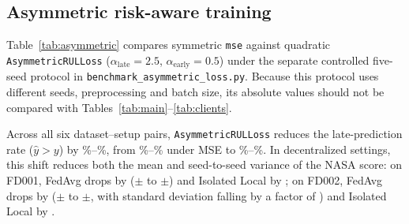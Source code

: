 \begin{table}[t]
\centering
\caption{FedAvg, FedProx and FedAdam across IID, regime-grouped and engine-count-imbalanced partitions on FD002 and FD004.}
\label{tab:partitions}

\end{table}

\begin{table}[t]
\centering
\caption{Per-client RMSE and NASA score on regime-grouped FD002 and FD004 (mean $\pm$ sample standard deviation over five paired seeds). Client labels denote the two operating-regime groups; ``exp.'' denotes the capped exponential objective.}
\label{tab:clients}

\end{table}

\begin{table}[t]
\centering
\caption{Paired exact sign-flip tests for baseline and method comparisons, by dataset, partition and metric.}
\label{tab:significance}

\end{table}

\subsection{Asymmetric risk-aware training}
Table~\ref{tab:asymmetric} compares symmetric \texttt{mse} against quadratic \texttt{AsymmetricRULLoss} ($\alpha_{\text{late}}{=}2.5$, $\alpha_{\text{early}}{=}0.5$) under the separate controlled five-seed protocol in \texttt{benchmark\_asymmetric\_loss.py}. Because this protocol uses different seeds, preprocessing and batch size, its absolute values should not be compared with Tables~\ref{tab:main}--\ref{tab:clients}.

\begin{table}[t]
\centering
\caption{Controlled five-seed comparison of symmetric MSE vs.\ \texttt{AsymmetricRULLoss} ($\alpha_{\text{late}}{=}2.5$, $\alpha_{\text{early}}{=}0.5$; seeds 42, 123, 456, 789, 1024; mean $\pm$ std). Source: \texttt{results/asymmetric\_loss\_comparison.json}. Bold marks the better value per setup and dataset.}
\label{tab:asymmetric}

\end{table}

Across all six dataset--setup pairs, \texttt{AsymmetricRULLoss} reduces the late-prediction rate ($\hat{y} > y$) by \AsymLateReductionMin{}\%--\AsymLateReductionMax{}\%, from \AsymMseLateMin{}\%--\AsymMseLateMax{}\% under MSE to \AsymLateMin{}\%--\AsymLateMax{}\%. In decentralized settings, this shift reduces both the mean and seed-to-seed variance of the NASA score: on FD001, FedAvg drops by \AsymFdOneFedNasaDelta{} (\AsymFdOneFedMseNasa{}$\pm$\AsymFdOneFedMseNasaStd{} to \AsymFdOneFedAsyNasa{}$\pm$\AsymFdOneFedAsyNasaStd{}) and Isolated Local by \AsymFdOneLocalNasaDelta{}; on FD002, FedAvg drops by \AsymFdTwoFedNasaDelta{} (\AsymFdTwoFedMseNasa{}$\pm$\AsymFdTwoFedMseNasaStd{} to \AsymFdTwoFedAsyNasa{}$\pm$\AsymFdTwoFedAsyNasaStd{}, with standard deviation falling by a factor of \AsymFdTwoFedNasaStdRatio{}) and Isolated Local by \AsymFdTwoLocalNasaDelta{}.

